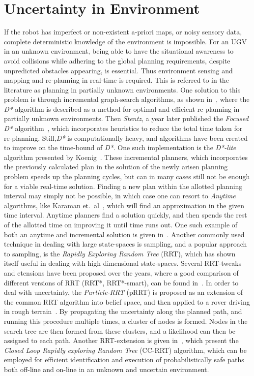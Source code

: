 \section{Uncertainty in Environment}
If the robot has imperfect or non-existent a-priori maps, or noisy sensory data,
complete deterministic knowledge of the environment is impossible. For an UGV in
an unknown environment, being able to have the situational awareness to avoid
collisions while adhering to the global planning requirements, despite
unpredicted obstacles appearing, is essential. Thus environment sensing and
mapping and re-planning in real-time is required. This is referred to in the
literature as planning in partially unknown environments. One solution to this
problem is through incremental graph-search algorithms, as shown
in~\cite{Stentz_1997}, where the \textsl{D*} algorithm is described as a method
for optimal and efficient re-planning in partially unknown environments. Then
\textit{Stentz}, a year later published the \textit{Focused D*}
algorithm~\cite{Stentz:1995:FDA:1643031.1643113}, which incorporates heuristics
to reduce the total time taken for re-planning. Still,\textit{D*} is
computationally heavy, and algorithms have been created to improve on the
time-bound of \textit{D*}. One such implementation is the \textit{D*-lite}
algorithm presented by Koenig~\cite{koenig2002d}. These incremental planners,
which incorporates the previously calculated plan in the solution of the newly
arisen planning problem speeds up the planning cycles, but can in many cases
still not be enough for a viable real-time solution. Finding a new plan within
the allotted planning interval may simply not be possible, in which case one can
resort to \textit{Anytime} algorithms, like Karaman et.\
al~\cite{karamanAnytimeMotionPlanning2011}, which will find an approximation in
the given time interval. Anytime planners find a solution quickly, and then
spends the rest of the allotted time on improving it until time runs out. One
such example of both an anytime and incremental solution is given
in~\cite{likhachevAnytimeSearchDynamic2008}. Another commonly used technique in
dealing with large state-spaces is sampling, and a popular approach to sampling,
is the \textit{Rapidly Exploring Random Tree} (RRT), which has shown itself
useful in dealing with high dimensional state-spaces. Several RRT-tweaks and
etensions have been proposed over the years, where a good comparison of
different versions of RRT (RRT*, RRT*-smart), can be found
in~\cite{noreenComparisonRRTRRT2016}. In order to deal with uncertainty, the
\textit{Particle-RRT} (pRRT) is proposed as an extension of the common RRT
algorithm into belief space, and then applied to a rover driving in rough
terrain~\cite{melchiorParticleRRTPath2007}. By propagating the uncertainty along
the planned path, and running this procedure multiple times, a cluster of nodes
is formed. Nodes in the search tree are then formed from these clusters, and a
likelihood can then be assigned to each path. Another RRT-extension is given
in~\cite{Luders_2013}, which present the \textit{Closed Loop Rapidly exploring
  Random Tree} (CC-RRT) algorithm, which can be employed for efficient
identification and execution of probabilistically safe paths both off-line and
on-line in an unknown and uncertain environment.

